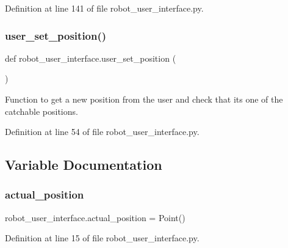 Definition at line 141 of file robot\+\_\+user\+\_\+interface.\+py.

\mbox{\label{namespacerobot__user__interface_af8347c189738ddfec5e6582d1a8839fa}} 
\subsubsection{\texorpdfstring{user\+\_\+set\+\_\+position()}{user\_set\_position()}}
{\footnotesize\ttfamily def robot\+\_\+user\+\_\+interface.\+user\+\_\+set\+\_\+position (\begin{DoxyParamCaption}{ }\end{DoxyParamCaption})}



Function to get a new position from the user and check that it\textquotesingle{}s one of the catchable positions. 



Definition at line 54 of file robot\+\_\+user\+\_\+interface.\+py.



\subsection{Variable Documentation}
\mbox{\label{namespacerobot__user__interface_a93557af62ae5a9f9fb406de12d599a58}} 
\subsubsection{\texorpdfstring{actual\+\_\+position}{actual\_position}}
{\footnotesize\ttfamily robot\+\_\+user\+\_\+interface.\+actual\+\_\+position = Point()}



Definition at line 15 of file robot\+\_\+user\+\_\+interface.\+py.

\mbox{\label{namespacerobot__user__interface_a57ca0e32cc10313871da599206689de6}} 
